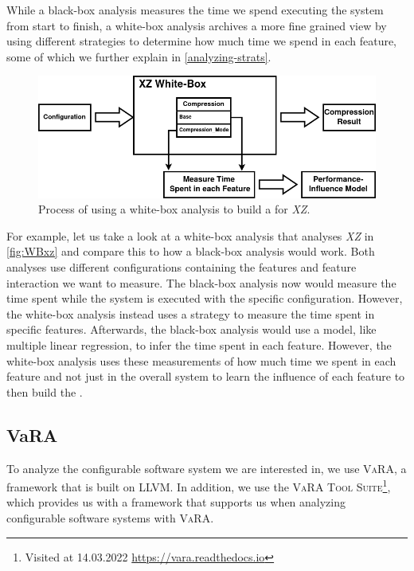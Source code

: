While a black-box analysis measures the time we spend executing the system from start to finish, 
a white-box analysis archives a more fine grained view by using different strategies to determine how much time we spend in each feature, some of which
we further explain in \autoref{analyzing-strats}.


\begin{figure}[h]
    \centering
    \includegraphics[scale=0.55]{gfx/whitebox_2.png}
    \caption{Process of using a white-box analysis to build a {\perfInfluenceModel} for \textit{XZ}.}
    \label{fig:WBxz}
\end{figure}

For example, let us take a look at a white-box analysis that analyses \textit{XZ} in \autoref{fig:WBxz} and compare this to how a black-box analysis would work.
Both analyses use different configurations containing the features and feature interaction we want to measure. 
The black-box analysis now would measure the time spent while the system is executed with the specific configuration.
However, the white-box analysis instead uses a strategy to measure the time spent in specific features. 
Afterwards, the black-box analysis would use a model, like multiple linear regression, to infer the time spent in each feature. 
However, the white-box analysis uses these measurements of how much time we spent in each feature and not just in the overall
system to learn the influence of each feature to then build the {\perfInfluenceModel}.

\subsection{VaRA}\label{VaRA}
To analyze the configurable software system we are interested in, we use \textsc{VaRA}, 
a framework that is built on \textsc{LLVM}.
In addition, we use the \textsc{VaRA Tool Suite}\footnote{Visited at 14.03.2022 \url{https://vara.readthedocs.io}}, which provides us with a framework that supports
us when analyzing configurable software systems with \textsc{VaRA}.
    

